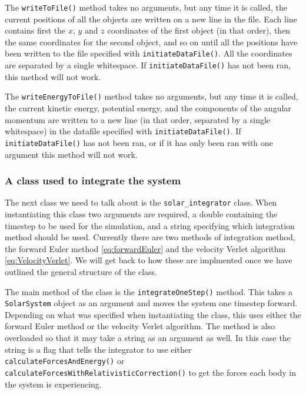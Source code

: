 \documentclass[reprint,english,notitlepage]{revtex4-1}  %
\begin{document}
\label{poi:write_to_file}
The \verb+writeToFile()+ method takes no arguments, but any time it is called, the current positions of all the objects are written on a new line in the file. Each line contains first the $x$, $y$ and $z$ coordinates of the first object (in that order), then the same coordinates for the second object, and so on until all the positions have been written to the file specified with \verb+initiateDataFile()+. All the coordinates are separated by a single whitespace. If \verb+initiateDataFile()+ has not been ran, this method will not work. \newline

\label{poi:write_energy_to_file}
The \verb+writeEnergyToFile()+ method takes no arguments, but any time it is called, the current kinetic energy, potential energy, and the components of the angular momentum are written to a new line (in that order, separated by a single whitespace) in the datafile specified with \verb+initiateDataFile()+. If \verb+initiateDataFile()+ has not been ran, or if it has only been ran with one argument this method will not work.


\subsubsection{A class used to integrate the system} \label{sec:III:a:3}

The next class we need to talk about is the \verb+solar_integrator+ class. When instantiating this class two arguments are required, a double containing the timestep to be used for the simulation, and a string specifying which integration method should be used. Currently there are two methods of integration method, the forward Euler method \eqref{eq:forwardEuler} and the velocity Verlet algorithm \eqref{eq:VelocityVerlet}. We will get back to how these are implmented once we have outlined the general structure of the class. 

The main method of the class is the \verb+integrateOneStep()+ method. This takes a \verb+SolarSystem+ object as an argument and moves the system one timestep forward. Depending on what was specified when instantiating the class, this uses either the forward Euler method or the velocity Verlet algorithm. The method is also overloaded so that it may take a string as an argument as well. In this case the string is a flag that tells the integrator to use either \verb+calculateForcesAndEnergy()+ or \verb+calculateForcesWithRelativisticCorrection()+ to get the forces each body in the system is experiencing. 
\end{document}
